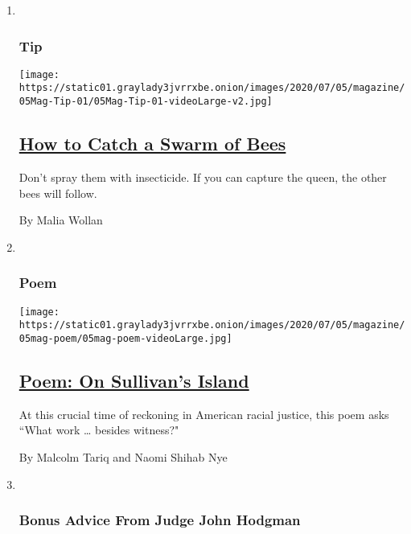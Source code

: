 \begin{enumerate}
\def\labelenumi{\arabic{enumi}.}
\item ~
  \hypertarget{tip}{%
  \subsubsection{Tip}\label{tip}}

  \texttt{[image: https://static01.graylady3jvrrxbe.onion/images/2020/07/05/magazine/05Mag-Tip-01/05Mag-Tip-01-videoLarge-v2.jpg]}

  \hypertarget{how-to-catch-a-swarm-of-bees}{%
  \subsection{\texorpdfstring{\href{/2020/06/30/magazine/how-to-catch-a-swarm-of-bees.html}{How
  to Catch a Swarm of
  Bees}}{How to Catch a Swarm of Bees}}\label{how-to-catch-a-swarm-of-bees}}

  Don't spray them with insecticide. If you can capture the queen, the
  other bees will follow.

  By Malia Wollan
\item ~
  \hypertarget{poem}{%
  \subsubsection{Poem}\label{poem}}

  \texttt{[image: https://static01.graylady3jvrrxbe.onion/images/2020/07/05/magazine/05mag-poem/05mag-poem-videoLarge.jpg]}

  \hypertarget{poem-on-sullivans-island}{%
  \subsection{\texorpdfstring{\href{/2020/07/02/magazine/poem-on-sullivans-island.html}{Poem:
  On Sullivan's
  Island}}{Poem: On Sullivan's Island}}\label{poem-on-sullivans-island}}

  At this crucial time of reckoning in American racial justice, this
  poem asks ``What work \ldots{} besides witness?"

  By Malcolm Tariq and Naomi Shihab Nye
\item ~
  \hypertarget{bonus-advice-from-judge-john-hodgman}{%
  \subsubsection{Bonus Advice From Judge John
  Hodgman}\label{bonus-advice-from-judge-john-hodgman}}


\end{enumerate}

